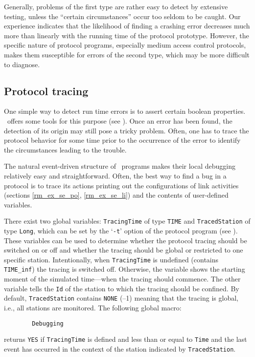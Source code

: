 Generally, problems of the first type are rather easy to detect by extensive
testing, unless the ``certain circumstances'' occur too seldom to be caught.
Our experience indicates that the likelihood of finding a crashing error
decreases much more than linearly with the running time of the protocol
prototype.
However, the specific nature of protocol programs, especially medium access
control protocols, makes them susceptible
for errors of the second type, which may be more difficult to diagnose.

\subsection{Protocol tracing}
\label{rm_ob_pt}

One simple way to detect run time errors is to assert certain boolean
properties.
\smurph\ offers some tools for this purpose (see ).
Once an error has been found, the detection of its origin may still pose
a tricky problem.
Often, one has to trace the protocol behavior for some time
prior to the occurrence of the error to identify the circumstances
leading to the trouble.

The natural event-driven structure of \smurph\ programs makes
their local debugging relatively easy and straightforward. 
Often, the best way to find a bug in a protocol is to
trace its actions printing out the configurations of link activities
(sections \ref{rm_ex_se_po}, \ref{rm_ex_se_li}) and
the contents of user-defined variables.

There exist two global variables:
{\tt TracingTime} of type {\tt TIME} and {\tt TracedStation} of type
{\tt Long}, which can be set by the
`{\tt -t}' option of the protocol program (see ).
These variables can be used to determine whether
the protocol tracing should be switched on or off and whether the tracing
should be global or restricted to one specific station.
Intentionally, when {\tt TracingTime} is undefined (contains {\tt TIME\_inf})
the tracing is switched off.
Otherwise, the variable shows the starting moment of the simulated time---when the tracing should commence.
The other variable tells the {\tt Id} of the station to which the tracing
should be confined.
By default, {\tt TracedStation} contains {\tt NONE} (--1) meaning that the
tracing is global, i.e., all stations are monitored.
The following global macro:
\begin{verbatim}
        Debugging
\end{verbatim}
returns {\tt YES} if {\tt TracingTime} is defined
and less than or equal to {\tt Time} and the last event has occurred in the
context of the station indicated by {\tt TracedStation}.

